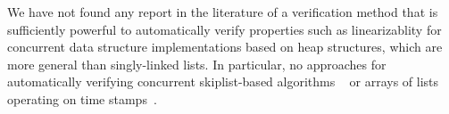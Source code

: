 
We have not found any report in the literature of a
verification method that is sufficiently powerful to
automatically verify properties such as linearizablity
for concurrent data structure implementations based on heap structures, which
are more general than singly-linked lists. In particular, no approaches
for automatically verifying concurrent skiplist-based algorithms
~\cite{Fomitchev:2004,ArtOfMpP,Linden:opodis13,Sundell:2005} or arrays of lists operating on time stamps~\cite{ts-stack}.



